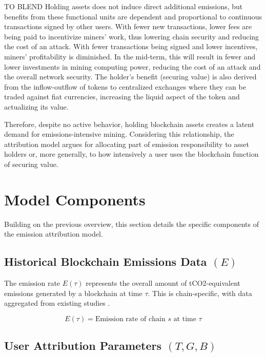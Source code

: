 \documentclass[11pt]{report}
\begin{document}
TO BLEND
Holding assets does not induce direct additional emissions, but benefits from these functional units are dependent and proportional to continuous transactions signed by other users. With fewer new transactions, lower fees are being paid to incentivize miners' work, thus lowering chain security and reducing the cost of an attack. With fewer transactions being signed and lower incentives, miners' profitability is diminished.  In the mid-term, this will result in fewer and lower investments in mining computing power, reducing the cost of an attack and the overall network security. The holder's benefit (securing value) is also derived from the inflow-outflow of tokens to centralized exchanges where they can be traded against fiat currencies, increasing the liquid aspect of the token and actualizing its value. 

Therefore, despite no active behavior, holding blockchain assets creates a latent demand for emissions-intensive mining. Considering this relationship, the attribution model argues for allocating part of emission responsibility to asset holders or, more generally, to how intensively a user uses the blockchain function of securing value.

\section{Model Components}

Building on the previous overview, this section details the specific components of the emission attribution model.

\subsection{Historical Blockchain Emissions Data $(E)$}
The emission rate \(E(\tau)\) represents the overall amount of tCO2-equivalent emissions generated by a blockchain at time $\tau$. This is chain-specific, with data aggregated from existing studies \cite{neumuellerCambridgeBitcoinElectricity2021,stollCarbonFootprintBitcoin2019}.

\begin{equation}
    E(\tau) = \text{Emission rate of chain $s$ at time $\tau$}
    \label{eq:emission_rate}
\end{equation}


\subsection{User Attribution Parameters $(T, G, B)$}
\end{document}
